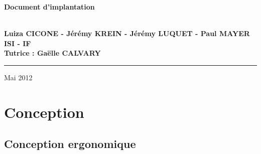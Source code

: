 \documentclass[a4paper, 11px]{article}
\begin{document}
\begin{titlepage}
\begin{center}
\begin{center}
{\Huge \bf Document d'implantation}


\end{center}


\vspace{1cm}

\begin{center}
$ $\\
\large{ \textbf{Luiza CICONE - Jérémy KREIN - Jérémy LUQUET - Paul MAYER}}\\
\large{ \textbf{ISI - IF}}\\
\large{ \textbf{Tutrice : Gaëlle CALVARY}}
$ $\\
\end{center}
\rule{\linewidth}{.5pt}


\vfill


{\large Mai 2012}

\end{center}
\end{titlepage}

\tableofcontents

\newpage

\section {Conception}
\subsection{Conception ergonomique}

\end{document}
